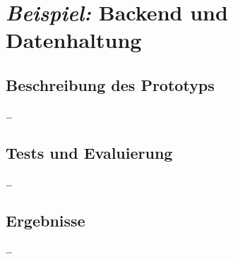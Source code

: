 
\section{\emph{Beispiel:} Backend und Datenhaltung\authorB}



\subsection{Beschreibung des Prototyps}

\ldots

\subsection{Tests und Evaluierung}

\ldots

\subsection{Ergebnisse}

\ldots